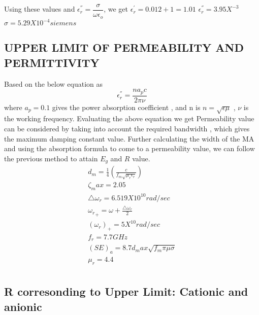 \documentclass[journal]{IEEEtran}
\begin{document}
Using these values and $ \epsilon^{''}_r = \dfrac{\sigma}{\omega \epsilon_o}$, we get
$\epsilon^{'}_r = 0.012 + 1 = 1.01 $
$\epsilon^{''}_r = 3.95X ^{-3}$
$ \sigma = 5.29 X 10^{-4} siemens$

\subsection{UPPER LIMIT OF  PERMEABILITY AND PERMITTIVITY}
Based on the below equation as 
$$ \epsilon^{''}_r  = \dfrac{n a_p c}{2 \pi \nu}$$
where $a_p = 0.1$ gives the power absorption coefficient , and n is $n = \sqrt{\epsilon \mu}$ , $\nu$ is the 
working frequency. Evaluating the above equation we get
Permeability value can be considered by taking into account the required bandwidth , which gives the maximum damping constant value.
Further calculating the width of the MA and using the absorption formula to come to a permeability value, we can follow the previous method to attain $E_g$ and $R $ value.
\begin{align}
d_m = \frac{1}{4}(\frac{c}{f_m \sqrt{\mu_r \epsilon_r}})   \\
\zeta_max= 2.05                                              \\
\triangle \omega_r = 6.519X 10^{10} rad/sec                   \\
{\omega_r}_+ = \omega + \frac{\triangle \omega_r}{2}            \\     
(\omega_r)_+ = 5 X ^{10} rad/sec                               \\
f_r = 7.7 GHz                                                 \\
(SE)_a = 8.7 d_max \sqrt{f_m \pi \mu \sigma}                  \\
\mu_r = 4.4                                                   \\
\end{align}

\subsection{R corresonding to Upper Limit: Cationic and anionic}
\end{document}
